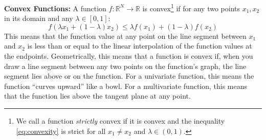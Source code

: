 \textbf{Convex Functions:}
A function $f: \mathbb{R}^N \to \mathbb{R}$ is convex\footnote{We call a function \emph{strictly} convex if it is convex and the inequality \autoref{eq:convexity} is strict for all $x_1 \neq x_2$ and $\lambda \in (0,1)$.} if for any two points $x_1, x_2$ in its domain and any $\lambda \in [0,1]$:
\begin{equation}
    f(\lambda x_1 + (1-\lambda) x_2) \leq \lambda f(x_1) + (1-\lambda) f(x_2)
    \label{eq:convexity}
\end{equation}
This means that the function value at any point on the line segment between $x_1$ and $x_2$ is less than or equal to the linear interpolation of the function values at the endpoints. Geometrically, this means that a function is convex if, when you draw a line segment between any two points on the function's graph, the line segment lies above or on the function. For a univariate function, this means the function ``curves upward'' like a bowl. For a multivariate function, this means that the function lies above the tangent plane at any point.

